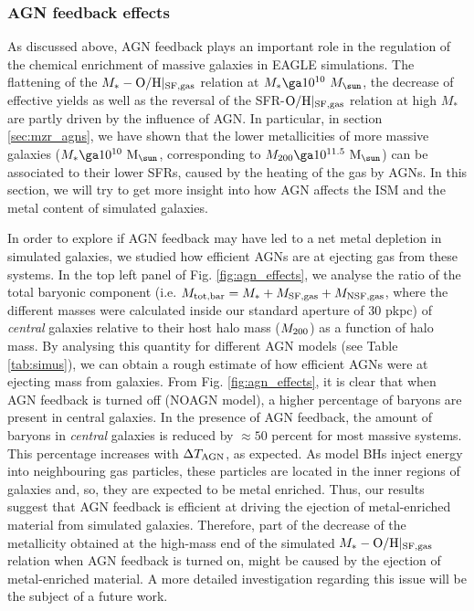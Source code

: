 \documentclass[useAMS,usenatbib]{mn2e}
\begin{document}
\subsubsection{AGN feedback effects}
\label{sec:agn_effects}

As discussed above, AGN feedback plays an important role in the regulation of the chemical
enrichment of massive galaxies in {\sc EAGLE} simulations.  The flattening of the 
$M_* - {\rm O/H}|_{\rm SF,gas}$ relation at $M_* \ga 10^{10} \ M_{\sun}$, the decrease of effective yields as well as the
reversal of the SFR-${\rm O/H}|_{\rm SF,gas}$ relation at high $M_*$ are partly driven 
by the influence of AGN.  In particular, in section \ref{sec:mzr_agns}, we have shown that the lower
metallicities of more massive galaxies ($M_* \ga 10^{10} \ {\rm M}_{\sun}$,
corresponding to $M_{200} \ga 10^{11.5} \ {\rm M}_{\sun}$) can be associated to their lower
SFRs, caused by the heating of the gas by AGNs.
In this section, we will try to get more insight into how AGN affects the ISM and 
the metal content of simulated galaxies.  

In order to explore if AGN feedback may have led to a net metal depletion in simulated galaxies,
we studied how efficient AGNs are at ejecting gas from these systems.  In the top left panel
of Fig. \ref{fig:agn_effects}, we analyse the ratio of the total baryonic component 
(i.e. $M_{\rm tot,bar} = M_* + M_{\rm SF,gas} + M_{\rm NSF,gas}$, where the different masses were
calculated inside our standard aperture of 30 pkpc) 
of {\em central} galaxies relative to their host halo mass ($M_{\rm 200}$) 
as a function of halo mass. By analysing this quantity
for different AGN models (see Table \ref{tab:simus}), we can obtain a rough estimate of how
efficient AGNs were at ejecting mass from galaxies.  
From Fig. \ref{fig:agn_effects}, it is clear that when AGN feedback is turned off (NOAGN model), 
a higher percentage of baryons are present in central galaxies. 
In the presence of AGN feedback, the amount of baryons in {\em central} galaxies 
is reduced by $\approx 50$ percent for most massive systems. 
This percentage increases with $\Delta T_{\rm AGN}$,
as expected. As model BHs inject energy into neighbouring gas particles,
these particles are located in the inner regions of galaxies and, so, they are expected to be metal enriched.
Thus, our results suggest that AGN feedback is efficient at driving the ejection of metal-enriched material
from simulated galaxies.
Therefore, part of the decrease of the metallicity obtained at the high-mass
end of the simulated $M_* - {\rm O/H}|_{\rm SF,gas}$ relation when AGN feedback is turned on, might be caused 
by the ejection of metal-enriched material. A more detailed investigation regarding
this issue will be the subject of a future work.
   
\end{document}
